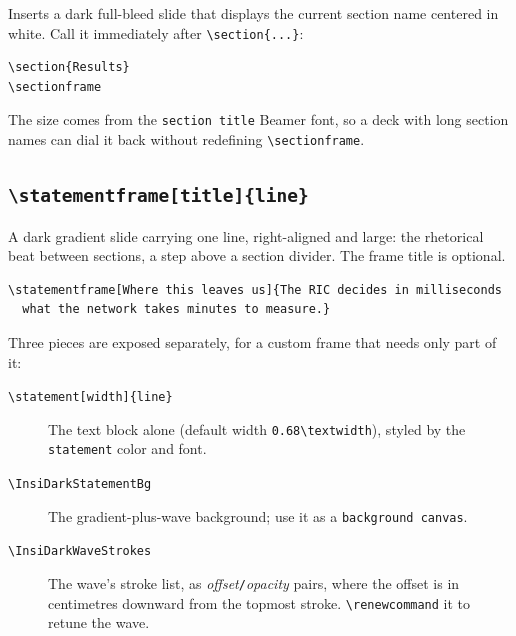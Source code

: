 \documentclass[a4paper,11pt]{article}
\begin{document}
Inserts a dark full-bleed slide that displays the current section name
centered in white.  Call it immediately after \verb|\section{...}|:

\begin{lstlisting}
\section{Results}
\sectionframe
\end{lstlisting}

The size comes from the \texttt{section title} Beamer font, so a deck with long
section names can dial it back without redefining \verb|\sectionframe|.

\subsection{\texttt{\textbackslash statementframe[title]\{line\}}}

A dark gradient slide carrying one line, right-aligned and large: the
rhetorical beat between sections, a step above a section divider.  The frame
title is optional.

\begin{lstlisting}
\statementframe[Where this leaves us]{The RIC decides in milliseconds
  what the network takes minutes to measure.}
\end{lstlisting}

Three pieces are exposed separately, for a custom frame that needs only part of
it:

\begin{description}
	\item[\texttt{\textbackslash statement[width]\{line\}}] The text block alone
	      (default width \verb|0.68\textwidth|), styled by the
	      \texttt{statement} color and font.
	\item[\texttt{\textbackslash InsiDarkStatementBg}] The gradient-plus-wave
	      background; use it as a \texttt{background canvas}.
	\item[\texttt{\textbackslash InsiDarkWaveStrokes}] The wave's stroke list, as
	      \textit{offset}\texttt{/}\textit{opacity} pairs, where the offset is in
	      centimetres downward from the topmost stroke.  \verb|\renewcommand| it
	      to retune the wave.
\end{description}
\end{document}
